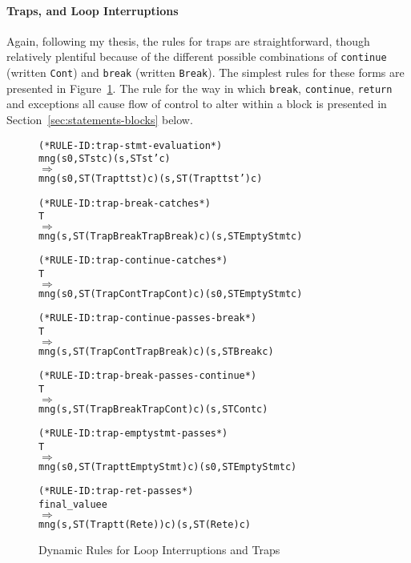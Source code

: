\documentclass[11pt]{article}
\begin{document}
\paragraph{Traps, and Loop Interruptions}
%
%
%
Again, following my thesis, the rules for traps are straightforward,
though relatively plentiful because of the different possible
combinations of \texttt{continue} (written \texttt{Cont}) and
\texttt{break} (written \texttt{Break}).  The simplest rules for these
forms are presented in Figure~\ref{fig:traps}.  The rule for the way
in which \texttt{break}, \texttt{continue}, \texttt{return} and
exceptions all cause flow of control to alter within a block is
presented in Section~\ref{sec:statements-blocks} below.

\begin{figure}[htbp]
%
%
%
%
%
%
%
\begin{alltt}
(* RULE-ID: trap-stmt-evaluation *)
     mng (s0, ST st c) (s, ST st' c)
   \(\Rightarrow\)
     mng (s0, ST (Trap tt st) c) (s, ST (Trap tt st') c)

(* RULE-ID: trap-break-catches *)
     T
   \(\Rightarrow\)
     mng (s, ST (Trap BreakTrap Break) c) (s, ST EmptyStmt c)

(* RULE-ID: trap-continue-catches *)
     T
   \(\Rightarrow\)
     mng (s0, ST (Trap ContTrap Cont) c) (s0, ST EmptyStmt c)

(* RULE-ID: trap-continue-passes-break *)
     T
   \(\Rightarrow\)
     mng (s, ST (Trap ContTrap Break) c) (s, ST Break c)

(* RULE-ID: trap-break-passes-continue *)
     T
   \(\Rightarrow\)
     mng (s, ST (Trap BreakTrap Cont) c) (s, ST Cont c)

(* RULE-ID: trap-emptystmt-passes *)
     T
   \(\Rightarrow\)
     mng (s0, ST (Trap tt EmptyStmt) c) (s0, ST EmptyStmt c)

(* RULE-ID: trap-ret-passes *)
     final_value e
   \(\Rightarrow\)
     mng (s, ST (Trap tt (Ret e)) c) (s, ST (Ret e) c)
\end{alltt}
  \caption{Dynamic Rules for Loop Interruptions and Traps}
  \label{fig:traps}
\end{figure}
\end{document}
